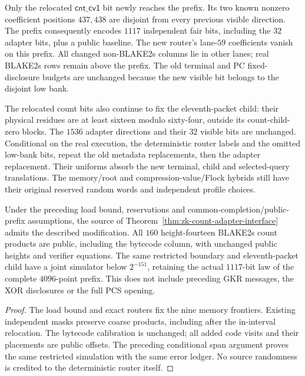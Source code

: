 Only the relocated $\mathsf{cnt\_cv1}$ bit newly reaches the prefix. Its two known nonzero coefficient positions $437,438$ are disjoint from every previous visible direction. The prefix consequently encodes $1117$ independent fair bits, including the $32$ adapter bits, plus a public baseline. The new router's lane-$59$ coefficients vanish on this prefix. All changed non-BLAKE2s columns lie in other lanes; real BLAKE2s rows remain above the prefix. The old terminal and PC fixed-disclosure budgets are unchanged because the new visible bit belongs to the disjoint low bank.

The relocated count bits also continue to fix the eleventh-packet child: their physical residues are at least sixteen modulo sixty-four, outside its count-child-zero blocks. The $1536$ adapter directions and their $32$ visible bits are unchanged. Conditional on the real execution, the deterministic router labels and the omitted low-bank bits, repeat the old metadata replacements, then the adapter replacement. Their uniforms absorb the new terminal, child and selected-query translations. The memory/root and compression-value/Flock hybrids still have their original reserved random words and independent profile choices.

\begin{theorem}\label{thm:zk-memory-coarse-normalization}
Under the preceding load bound, reservations and common-completion/public-prefix assumptions, the source of Theorem~\ref{thm:zk-count-adapter-interface} admits the described modification. All $160$ height-fourteen BLAKE2s count products are public, including the bytecode column, with unchanged public heights and verifier equations. The same restricted boundary and eleventh-packet child have a joint simulator below $2^{-151}$, retaining the actual $1117$-bit law of the complete $4096$-point prefix. This does not include preceding GKR messages, the XOR disclosures or the full PCS opening.
\end{theorem}
\begin{proof}
The load bound and exact routers fix the nine memory frontiers. Existing independent masks preserve coarse products, including after the in-interval relocation. The bytecode calibration is unchanged; all added code visits and their placements are public offsets. The preceding conditional span argument proves the same restricted simulation with the same error ledger. No source randomness is credited to the deterministic router itself.
\end{proof}

